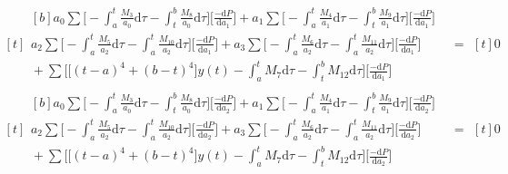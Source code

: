 \documentclass{article}
\begin{document}
\begin{equation}\label{eqn.115}
\begin{aligned}[t]
	\begin{aligned}[b]
	a_{0} \sum \bigg[-\int_{a}^{t}\frac{M_{3}}{a_{0}}\mathrm{d}\tau-\int_{t}^{b}\frac{M_{8}}{a_{0}}\mathrm{d}\tau\bigg] \bigg[\frac{-\mathrm{d}P}{\mathrm{d}a_{1}}\bigg] + a_{1} \sum \bigg[-\int_{a}^{t}\frac{M_{4}}{a_{1}}\mathrm{d}\tau-\int_{t}^{b}\frac{M_{9}}{a_{1}}\mathrm{d}\tau\bigg] \bigg[\frac{-\mathrm{d}P}{\mathrm{d}a_{1}}\bigg] \\
	a_{2} \sum \bigg[-\int_{a}^{t}\frac{M_{5}}{a_{2}}\mathrm{d}\tau-\int_{a}^{t}\frac{M_{10}}{a_{2}}\mathrm{d}\tau\bigg] \bigg[\frac{-\mathrm{d}P}{\mathrm{d}a_{1}}\bigg] + a_{3} \sum \bigg[-\int_{a}^{t}\frac{M_{6}}{a_{2}}\mathrm{d}\tau-\int_{a}^{t}\frac{M_{11}}{a_{2}}\mathrm{d}\tau\bigg] \bigg[\frac{-\mathrm{d}P}{\mathrm{d}a_{1}}\bigg] \\ 
	{} +\sum\bigg[\big[(t-a)^4+(b-t)^4\big]y(t) -\int_{a}^{t}{M_{7}}\mathrm{d}\tau-\int_{t}^{b}{M_{12}}\mathrm{d}\tau \bigg]\bigg[\frac{-\mathrm{d}P}{\mathrm{d}a_{1}}\bigg]
	\end{aligned}
	& =
	\begin{aligned}[t]
	0
	\end{aligned}
\end{aligned}
\end{equation}
\begin{equation}\label{eqn.116}
\begin{aligned}[t]
	\begin{aligned}[b]
	a_{0} \sum \bigg[-\int_{a}^{t}\frac{M_{3}}{a_{0}}\mathrm{d}\tau-\int_{t}^{b}\frac{M_{8}}{a_{0}}\mathrm{d}\tau\bigg] \bigg[\frac{-\mathrm{d}P}{\mathrm{d}a_{2}}\bigg] + a_{1} \sum \bigg[-\int_{a}^{t}\frac{M_{4}}{a_{1}}\mathrm{d}\tau-\int_{t}^{b}\frac{M_{9}}{a_{1}}\mathrm{d}\tau\bigg] \bigg[\frac{-\mathrm{d}P}{\mathrm{d}a_{2}}\bigg] \\
	a_{2} \sum \bigg[-\int_{a}^{t}\frac{M_{5}}{a_{2}}\mathrm{d}\tau-\int_{a}^{t}\frac{M_{10}}{a_{2}}\mathrm{d}\tau\bigg] \bigg[\frac{-\mathrm{d}P}{\mathrm{d}a_{2}}\bigg] + a_{3} \sum \bigg[-\int_{a}^{t}\frac{M_{6}}{a_{2}}\mathrm{d}\tau-\int_{a}^{t}\frac{M_{11}}{a_{2}}\mathrm{d}\tau\bigg] \bigg[\frac{-\mathrm{d}P}{\mathrm{d}a_{2}}\bigg] \\ 
	{} +\sum\bigg[\big[(t-a)^4+(b-t)^4\big]y(t) -\int_{a}^{t}{M_{7}}\mathrm{d}\tau-\int_{t}^{b}{M_{12}}\mathrm{d}\tau \bigg]\bigg[\frac{-\mathrm{d}P}{\mathrm{d}a_{2}}\bigg]
	\end{aligned}
	& =
	\begin{aligned}[t]
	0
	\end{aligned}
\end{aligned}
\end{equation}
\end{document}
